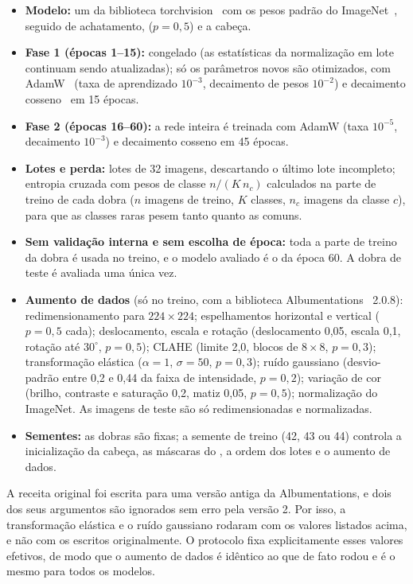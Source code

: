 \begin{itemize}
    \item \textbf{Modelo:} um  da biblioteca torchvision~\cite{paszke2019pytorch} com os pesos padrão do ImageNet~\cite{deng2009imagenet}, seguido de achatamento,  ($p=0{,}5$) e a cabeça.
    \item \textbf{Fase 1 (épocas 1--15):}  congelado (as estatísticas da normalização em lote continuam sendo atualizadas); só os parâmetros novos são otimizados, com AdamW~\cite{loshchilov2019adamw} (taxa de aprendizado $10^{-3}$, decaimento de pesos $10^{-2}$) e decaimento cosseno~\cite{loshchilov2017sgdr} em 15 épocas.
    \item \textbf{Fase 2 (épocas 16--60):} a rede inteira é treinada com AdamW (taxa $10^{-5}$, decaimento $10^{-3}$) e decaimento cosseno em 45 épocas.
    \item \textbf{Lotes e perda:} lotes de 32 imagens, descartando o último lote incompleto; entropia cruzada com pesos de classe $n/(K\,n_c)$ calculados na parte de treino de cada dobra ($n$ imagens de treino, $K$ classes, $n_c$ imagens da classe $c$), para que as classes raras pesem tanto quanto as comuns.
    \item \textbf{Sem validação interna e sem escolha de época:} toda a parte de treino da dobra é usada no treino, e o modelo avaliado é o da época 60. A dobra de teste é avaliada uma única vez.
    \item \textbf{Aumento de dados} (só no treino, com a biblioteca Albumentations~\cite{buslaev2020albumentations} 2.0.8): redimensionamento para $224 \times 224$; espelhamentos horizontal e vertical ($p=0{,}5$ cada); deslocamento, escala e rotação (deslocamento 0,05, escala 0,1, rotação até $30^\circ$, $p=0{,}5$); \gls{CLAHE} (limite 2,0, blocos de $8 \times 8$, $p=0{,}3$); transformação elástica ($\alpha=1$, $\sigma=50$, $p=0{,}3$); ruído gaussiano (desvio-padrão entre 0,2 e 0,44 da faixa de intensidade, $p=0{,}2$); variação de cor (brilho, contraste e saturação 0,2, matiz 0,05, $p=0{,}5$); normalização do ImageNet. As imagens de teste são só redimensionadas e normalizadas.
    \item \textbf{Sementes:} as dobras são fixas; a semente de treino (42, 43 ou 44) controla a inicialização da cabeça, as máscaras do , a ordem dos lotes e o aumento de dados.
\end{itemize}

A receita original foi escrita para uma versão antiga da Albumentations, e dois dos seus argumentos são ignorados sem erro pela versão 2. Por isso, a transformação elástica e o ruído gaussiano rodaram com os valores listados acima, e não com os escritos originalmente. O protocolo fixa explicitamente esses valores efetivos, de modo que o aumento de dados é idêntico ao que de fato rodou e é o mesmo para todos os modelos.

